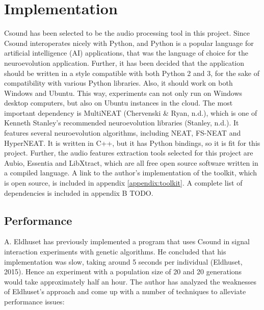 \section{Implementation}
Csound has been selected to be the audio processing tool in this project. Since Csound interoperates nicely with Python, and Python is a popular language for artificial intelligence (AI) applications, that was the language of choice for the neuroevolution application. Further, it has been decided that the application should be written in a style compatible with both Python 2 and 3, for the sake of compatibility with various Python libraries. Also, it should work on both Windows and Ubuntu. This way, experiments can not only run on Windows desktop computers, but also on Ubuntu instances in the cloud. The most important dependency is MultiNEAT (Chervenski \& Ryan, n.d.), which is one of Kenneth Stanley’s recommended neuroevolution libraries (Stanley, n.d.). It features several neuroevolution algorithms, including NEAT, FS-NEAT and HyperNEAT. It is written in C++, but it has Python bindings, so it is fit for this project. Further, the audio features extraction tools selected for this project are Aubio, Essentia and LibXtract, which are all free open source software written in a compiled language. A link to the author’s implementation of the toolkit, which is open source, is included in appendix \ref{appendix:toolkit}. A complete list of dependencies is included in appendix B TODO.

\subsection{Performance}
A. Eldhuset has previously implemented a program that uses Csound in signal interaction experiments with genetic algorithms. He concluded that his implementation was slow, taking around 5 seconds per individual (Eldhuset, 2015). Hence an experiment with a population size of 20 and 20 generations would take approximately half an hour. The author has analyzed the weaknesses of Eldhuset's approach and come up with a number of techniques to alleviate performance issues:

